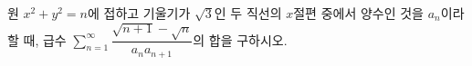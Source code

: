 원 $x^2+y^2=n$에 접하고 기울기가 $\sqrt{3}$인 두 직선의 $x$절편 중에서 양수인 것을 $a_n$이라 할 때, 급수 $\displaystyle\sum_{n=1}^{\infty}\dfrac{\sqrt{n+1}-\sqrt{n}}{a_na_{n+1}}$의 합을 구하시오.

